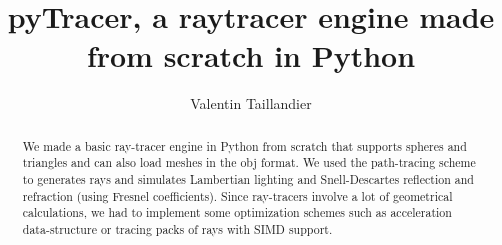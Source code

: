 \documentclass[acmsmall]{acmart}
\begin{document}
\title{pyTracer, a raytracer engine made from scratch in Python}

\author{Valentin Taillandier}

\renewcommand{\shortauthors}{Valentin Taillandier}

\begin{abstract}
We made a basic ray-tracer engine in Python from scratch that supports spheres and triangles and can also load meshes in the obj format.
We used the path-tracing scheme to generates rays and simulates Lambertian lighting and Snell-Descartes reflection and refraction (using Fresnel coefficients).
Since ray-tracers involve a lot of geometrical calculations, we had to implement some optimization schemes such as acceleration data-structure or tracing packs of rays with SIMD support.

\end{abstract}




\maketitle
\end{document}
